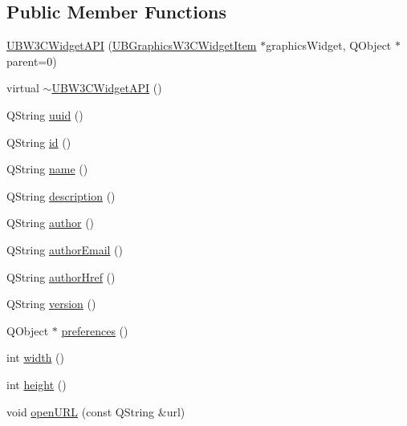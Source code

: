\subsection*{Public Member Functions}
\begin{DoxyCompactItemize}
\item 
\hyperlink{class_u_b_w3_c_widget_a_p_i_ad08e5e1f29f4192abcf22314fa6d6da1}{U\-B\-W3\-C\-Widget\-A\-P\-I} (\hyperlink{class_u_b_graphics_w3_c_widget_item}{U\-B\-Graphics\-W3\-C\-Widget\-Item} $\ast$graphics\-Widget, Q\-Object $\ast$parent=0)
\item 
virtual \hyperlink{class_u_b_w3_c_widget_a_p_i_a4fcf8744d36ab24116f072af4c8f18af}{$\sim$\-U\-B\-W3\-C\-Widget\-A\-P\-I} ()
\item 
Q\-String \hyperlink{class_u_b_w3_c_widget_a_p_i_a51208ef96bdb7e03dc189f41541c2ccc}{uuid} ()
\item 
Q\-String \hyperlink{class_u_b_w3_c_widget_a_p_i_a7c0c2ee5da8bf73db6964df55daa5910}{id} ()
\item 
Q\-String \hyperlink{class_u_b_w3_c_widget_a_p_i_ad920c04aea08c2e35bd1d3774c3e34f1}{name} ()
\item 
Q\-String \hyperlink{class_u_b_w3_c_widget_a_p_i_a9e0c3e7f516bb0334b5bce40e7d199a7}{description} ()
\item 
Q\-String \hyperlink{class_u_b_w3_c_widget_a_p_i_a6d7efb7d4cfe94e1a6ebf64f639f183c}{author} ()
\item 
Q\-String \hyperlink{class_u_b_w3_c_widget_a_p_i_abe21cf86fe99c4070a5ee172fa23d15d}{author\-Email} ()
\item 
Q\-String \hyperlink{class_u_b_w3_c_widget_a_p_i_ac0a804cef41422a78f43cf7e39d5762f}{author\-Href} ()
\item 
Q\-String \hyperlink{class_u_b_w3_c_widget_a_p_i_a52585938277d1a5789738615968449f5}{version} ()
\item 
Q\-Object $\ast$ \hyperlink{class_u_b_w3_c_widget_a_p_i_a53974a000bbb3f16fb29329d5e797378}{preferences} ()
\item 
int \hyperlink{class_u_b_w3_c_widget_a_p_i_a1f59ec53bee6ff1c4a9ad0b0b865fbe6}{width} ()
\item 
int \hyperlink{class_u_b_w3_c_widget_a_p_i_ad98333534e01d5583de95c775d2660fe}{height} ()
\item 
void \hyperlink{class_u_b_w3_c_widget_a_p_i_a3ae232b04234dfa844228a9ff34b98bb}{open\-U\-R\-L} (const Q\-String \&url)
\end{DoxyCompactItemize}
